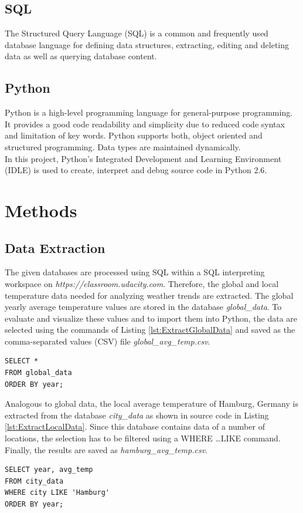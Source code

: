 \documentclass[a4paper]{article}
\begin{document}
\subsection{SQL}
The Structured Query Language (SQL) is a common and frequently used database language for defining data structures, extracting, editing and deleting data as well as querying database content.

\subsection{Python}
Python is a high-level programming language for general-purpose programming. It provides a good code readability and simplicity due to reduced code syntax and limitation of key words. Python supports both, object oriented and structured programming. Data types are maintained dynamically.\\
In this project, Python's Integrated Development and Learning Environment (IDLE) is used to create, interpret and debug source code in Python 2.6. 

\section{Methods}
\subsection{Data Extraction}
The given databases are processed using SQL within a SQL interpreting workspace on \emph{https://classroom.udacity.com}. Therefore, the global and local temperature data needed for analyzing weather trends are extracted. The global yearly average temperature values are stored in the database \emph{global\_data}. To evaluate and visualize these values and to import them into Python, the data are selected using the commands of Listing \ref{lst:ExtractGlobalData} and saved as the comma-separated values (CSV) file \emph{global\_avg\_temp.csv}.
\begin{lstlisting}[caption={Extract global data from database using SQL},label=lst:ExtractGlobalData]
SELECT * 
FROM global_data
ORDER BY year;
\end{lstlisting}
Analogous to global data, the local average temperature of Hamburg, Germany is extracted from the database \emph{city\_data} as shown in source code in Listing \ref{lst:ExtractLocalData}. Since this database contains data of a number of locations, the selection has to be filtered using a WHERE \dots LIKE command. Finally, the results are saved as \emph{hamburg\_avg\_temp.csv}.
\begin{lstlisting}[caption={Extract local data of Hamburg from database using SQL},label=lst:ExtractLocalData]
SELECT year, avg_temp 
FROM city_data
WHERE city LIKE 'Hamburg'
ORDER BY year;
\end{lstlisting}
\end{document}
